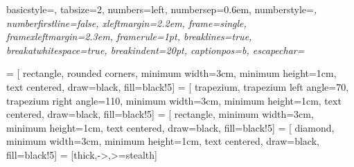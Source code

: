 
{
  basicstyle=\ttfamily\footnotesize,
  tabsize=2,
  numbers=left,
  numbersep=0.6em,      %
  numberstyle=\footnotesize\ttfamily\itshape,
  numberfirstline=false,
  xleftmargin=2.2em,    %
  frame=single,      %
  framexleftmargin=2.3em,  %
  framerule=1pt,
  breaklines=true,
  breakatwhitespace=true,
  breakindent=20pt,
  captionpos=b,
  escapechar=~
}

{
  \fancyhf{}  %
  \fancyhead[LE,RO] {\thepage}
  \renewcommand {\headrulewidth}{0pt}
  \renewcommand {\footrulewidth}{0pt}
}

 = [
  rectangle,
  rounded corners,
  minimum width=3cm, minimum height=1cm,
  text centered,
  draw=black,
  fill=black!5]
 = [
  trapezium,
  trapezium left angle=70,
  trapezium right angle=110,
  minimum width=3cm, minimum height=1cm,
  text centered,
  draw=black,
  fill=black!5]
 = [
  rectangle,
  minimum width=3cm, minimum height=1cm,
  text centered,
  draw=black,
  fill=black!5]
 = [
  diamond,
  minimum width=3cm, minimum height=1cm,
  text centered,
  draw=black,
  fill=black!5]
 = [thick,->,>=stealth]
